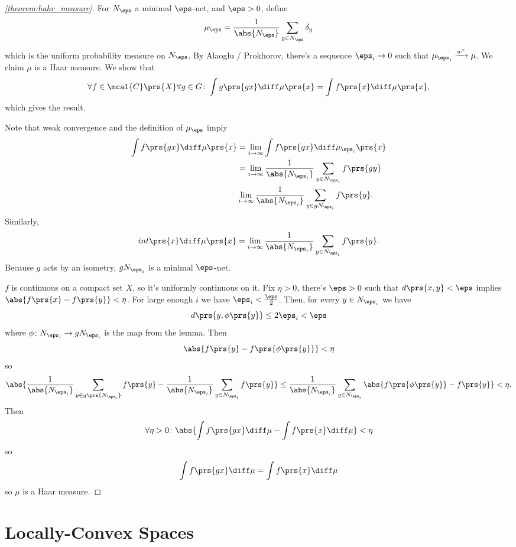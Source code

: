 \documentclass[10pt, twoside]{book}
\begin{document}
\begin{proof}[\ref{theorem:hahr_measure}]
For $N_\eps$ a minimal $\eps$-net, and $\eps > 0$, define
\[\mu_\eps = \frac{1}{\abs{N_\eps}} \sum_{y \in N_\eps} \delta_y\]
which is the uniform probability measure on $N_\eps$.
By Alaoglu / Prokhorov, there's a sequence $\eps_i \to 0$ such that $\mu_{\eps_i} \xrightarrow{w^*} \mu$. We claim $\mu$ is a Haar measure. We show that
\[\forall f \in \mcal{C}\prs{X} \forall g \in G \colon \int g\prs{gx} \diff \mu\prs{x} = \int f\prs{x} \diff \mu\prs{x} \text{,}\]
which gives the result.

Note that weak convergence and the definition of $\mu_{\eps}$ imply
\begin{align*}
\int f\prs{gx} \diff \mu\prs{x} &= \lim_{i\to\infty} \int f\prs{gx} \diff \mu_{\eps_i}\prs{x}
\\&= \lim_{i\to\infty} \frac{1}{\abs{N_{\eps_i}}} \sum_{y \in N_{\eps_i}} f\prs{gy}
\\& \lim_{i\to\infty} \frac{1}{\abs{N_{\eps_i}}} \sum_{y \in g N_{\eps_i}} f\prs{y} \text{.}
\end{align*}
Similarly,
\[\\int \prs{x} \diff \mu\prs{x} = \lim_{i\to\infty} \frac{1}{\abs{N_{\eps_i}}} \sum_{y \in N_{\eps_i}} f\prs{y} \text{.}\]
Because $g$ acts by an isometry, $g N_{\eps_i}$ is a minimal $\eps$-net.

$f$ is continuous on a compact set $X$, so it's uniformly continuous on it. Fix $\eta > 0$, there's $\eps > 0$ such that $d\prs{x,y} < \eps$ implies $\abs{f\prs{x} - f\prs{y}} < \eta$.
For large enough $i$ we have $\eps_i < \frac{\eps}{2}$. Then, for every $y \in N_{\eps_i}$ we have
\[d\prs{y,\phi\prs{y}} \leq 2 \eps_i < \eps\]
where $\phi \colon N_{\eps_i} \to g N_{\eps_i}$ is the map from the lemma.
Then
\[\abs{f\prs{y} - f\prs{\phi\prs{y}}} < \eta\]
so
\[\abs{\frac{1}{\abs{N_{\eps_i}}} \sum_{y \in g\prs{N_{\eps_i}}} f\prs{y} - \frac{1}{\abs{N_{\eps_i}}} \sum_{y \in N_{\eps_i}} f\prs{y}}
\leq \frac{1}{\abs{N_{\eps_i}}} \sum_{y \in N_{\eps_i}} \abs{f\prs{\phi\prs{y}} - f\prs{y}} < \eta \text{.}\]
Then
\[\forall \eta > 0 \colon \abs{\int f\prs{gx} \diff \mu - \int f\prs{x} \diff \mu} < \eta\]
so
\[\int f\prs{gx} \diff \mu = \int f\prs{x} \diff \mu\]
so $\mu$ is a Haar measure.
\end{proof}


\section{Locally-Convex Spaces}
\end{document}
